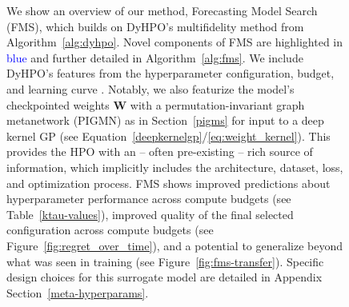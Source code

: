 \documentclass{article}
\begin{document}
\begin{figure}[h]
    \caption{We show an overview of our method, Forecasting Model Search (FMS), which builds on DyHPO's multifidelity method from Algorithm~\ref{alg:dyhpo}. Novel components of FMS are highlighted in \textcolor{blue}{blue} and further detailed in Algorithm~\ref{alg:fms}. We include DyHPO's features from the hyperparameter configuration, budget, and learning curve \cite{wistuba2023supervising}. Notably, we also featurize the model's checkpointed weights $\mathbf{W}$ with a permutation-invariant graph metanetwork (PIGMN) as in Section~\ref{pigms} for input to a deep kernel GP (see Equation~\ref{deepkernelgp}/\ref{eq:weight_kernel}). This provides the HPO with an -- often pre-existing -- rich source of information, which implicitly includes the architecture, dataset, loss, and optimization process. FMS shows improved predictions about hyperparameter performance across compute budgets (see Table~\ref{ktau-values}), improved quality of the final selected configuration across compute budgets (see Figure~\ref{fig:regret_over_time}), and a potential to generalize beyond what was seen in training (see Figure~\ref{fig:fms-transfer}). Specific design choices for this surrogate model are detailed in Appendix Section~\ref{meta-hyperparams}.}
    \label{fig:fms-diagram}
\end{figure}
\end{document}
